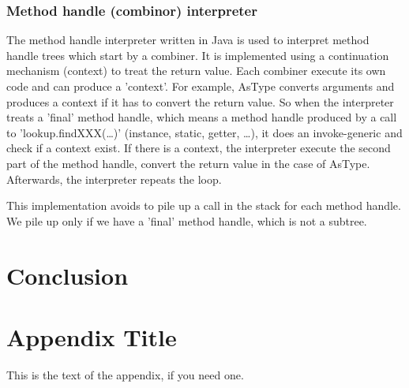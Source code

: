 \documentclass{sigplanconf}
\begin{document}
%        

      \subsubsection{Method handle (combinor) interpreter}

        The method handle interpreter written in Java%
        is used to interpret method handle trees which start by a combiner.
        It is implemented using a continuation mechanism (context) to treat the return value.
        Each combiner execute its own code and can produce a 'context'.
        For example, AsType converts arguments and produces a context if it has to convert the return value.
        So when the interpreter treats a 'final' method handle,
        which means a method handle produced by a call to 'lookup.findXXX(\dots)' (instance, static, getter, \dots),
        it does an invoke-generic and check if a context exist.
        If there is a context, the interpreter execute the second part of the method handle,
        convert the return value in the case of AsType.
        Afterwards, the interpreter repeats the loop.

        
    
        This implementation avoids to pile up a call in the stack for each method handle.
        We pile up only if we have a 'final' method handle, which is not a subtree.

%      

\section{Conclusion}

\appendix
\section{Appendix Title}

This is the text of the appendix, if you need one.

\acks
\end{document}
